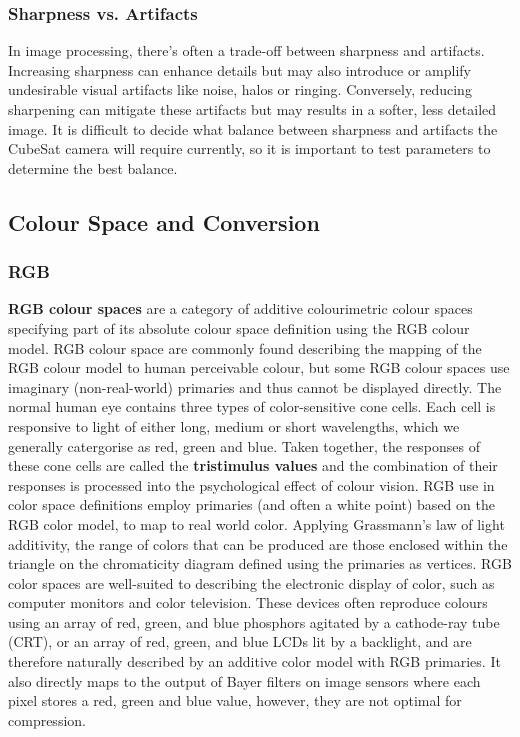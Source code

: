 \documentclass[10pt]{article}
\begin{document}
\begin{multicols}{2}
\subsubsection{Sharpness vs. Artifacts}
In image processing, there's often a trade-off between sharpness and artifacts. Increasing sharpness can enhance details but may also introduce or amplify undesirable visual artifacts like noise, halos or ringing. Conversely, reducing sharpening can mitigate these artifacts but may results in a softer, less detailed image.
\newline
It is difficult to decide what balance between sharpness and artifacts the CubeSat camera will require currently, so it is important to test parameters to determine the best balance.

\subsection{Colour Space and Conversion}
\subsubsection{RGB}
\textbf{RGB colour spaces} are a category of additive colourimetric colour spaces specifying part of its absolute colour space definition using the RGB colour model.
\newline \newline
RGB colour space are commonly found describing the mapping of the RGB colour model to human perceivable colour, but some RGB colour spaces use imaginary (non-real-world) primaries and thus cannot be displayed directly.
\newline \newline
The normal human eye contains three types of color-sensitive cone cells. Each cell is responsive to light of either long, medium or short wavelengths, which we generally catergorise as red, green and blue. Taken together, the responses of these cone cells are called the \textbf{tristimulus values} and the combination of their responses is processed into the psychological effect of colour vision.
RGB use in color space definitions employ primaries (and often a white point) based on the RGB color model, to map to real world color. Applying Grassmann's law of light additivity, the range of colors that can be produced are those enclosed within the triangle on the chromaticity diagram defined using the primaries as vertices.
\newline \newline
RGB color spaces are well-suited to describing the electronic display of color, such as computer monitors and color television. These devices often reproduce colours using an array of red, green, and blue phosphors agitated by a cathode-ray tube (CRT), or an array of red, green, and blue LCDs lit by a backlight, and are therefore naturally described by an additive color model with RGB primaries.
It also directly maps to the output of Bayer filters on image sensors where each pixel stores a red, green and blue value, however, they are not optimal for compression.


\end{multicols}
\end{document}
